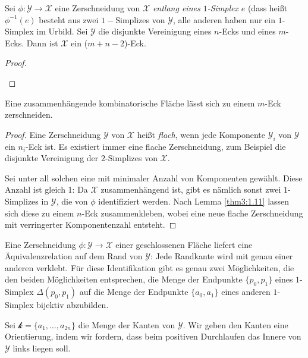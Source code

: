 \documentclass[a4paper,10pt]{scrartcl}
\begin{document}
\begin{lem}\label{thm3:1.11} 
 Sei $\phi: \mathcal Y\to \mathcal X$ eine Zerschneidung von $\mathcal X$ \emph{entlang eines $1$-Simplex} $e$ (dass heißt $\phi^{-1}(e)$ besteht aus zwei $1-$Simplizes von $\mathcal Y$, alle anderen haben nur ein $1$-Simplex im Urbild. Sei $\mathcal Y$ die disjunkte Vereinigung eines $n$-Ecks und eines $m$-Ecks. Dann ist $\mathcal X$ ein ($m+n-2$)-Eck.
\end{lem}
\begin{proof}
 \begin{figure}[H]
 \centering
\fixme[fig133]
\caption{}
\end{figure}
\end{proof}
\begin{st}
 Eine zusammenhängende kombinatorische Fläche lässt sich zu einem $m$-Eck zerschneiden.
\end{st}
\begin{proof}
 Eine Zerschneidung $\mathcal Y$ von $\mathcal X$ heißt \emph{flach}, wenn jede Komponente $\mathcal Y_i$ von $\mathcal Y$ ein $n_i$-Eck ist. Es existiert immer eine flache Zerschneidung, zum Beispiel die disjunkte Vereinigung der $2$-Simplizes von $\mathcal X$.
\begin{figure}[H]
 \centering
\fixme[fig134]
\caption{}
\end{figure}
Sei unter all solchen eine mit minimaler Anzahl von Komponenten gewählt.
Diese Anzahl ist gleich 1:
 Da $\mathcal X$ zusammenhängend ist, gibt es nämlich sonst zwei $1$-Simplizes in $\mathcal Y$, die von $\phi$ identifiziert werden. Nach Lemma \ref{thm3:1.11} lassen sich diese zu einem $n$-Eck zusammenkleben, wobei eine neue flache Zerschneidung mit verringerter Komponentenzahl entsteht.
\end{proof}

Eine Zerschneidung $\phi: \mathcal Y \to \mathcal X$ einer geschlossenen Fläche liefert eine Äquivalenzrelation auf dem Rand von $\mathcal Y$: Jede Randkante wird mit genau einer anderen verklebt. Für diese Identifikation gibt es genau zwei Möglichkeiten, die den beiden Möglichkeiten entsprechen, die Menge der Endpunkte $\{p_0, p_1\}$ eines $1$-Simplex $\Delta(p_0, p_1)$ auf die Menge der Endpunkte $\{a_0, a_1\}$ eines anderen $1$-Simplex bijektiv abzubilden.

Sei $\mathcal k=\{a_1, \dotsc  , a_{2n}\}$ die Menge der Kanten von $\mathcal Y$. Wir geben den Kanten eine Orientierung, indem wir fordern, dass beim positiven Durchlaufen das Innere von $\mathcal Y$ links liegen soll.
\end{document}

